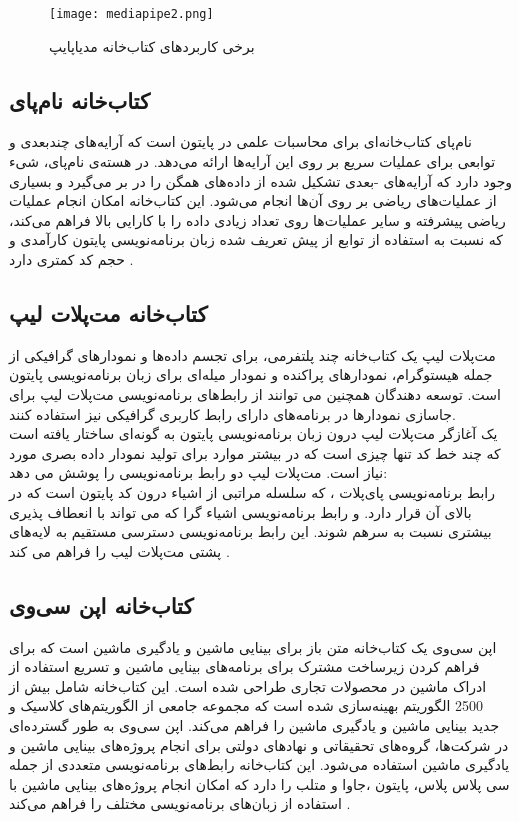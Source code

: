 \begin{figure}[h]
    \centering
    \texttt{[image: mediapipe2.png]}
    \caption[برخی کاربردهای کتاب‌خانه مدیاپایپ]{برخی کاربردهای کتاب‌خانه مدیاپایپ \cite{harris2021applying}}
\end{figure}

\subsection{کتاب‌خانه نام‌پای}
نام‌پای کتاب‌خانه‌ای برای محاسبات علمی در پایتون است که آرایه‌های چندبعدی و توابعی برای عملیات سریع  بر روی این آرایه‌ها ارائه می‌دهد. در هسته‌ی نام‌پای، شیء  وجود 
دارد که آرایه‌های -بعدی تشکیل شده از داده‌های همگن را در بر می‌گیرد و بسیاری از عملیات‌های ریاضی بر روی آن‌ها انجام می‌شود. این کتاب‌خانه امکان انجام عملیات ریاضی پیشرفته و سایر 
عملیات‌ها روی تعداد زیادی داده را با کارایی بالا فراهم می‌کند، که نسبت به استفاده از توابع از پیش تعریف شده زبان برنامه‌نویسی پایتون کارآمدی و حجم کد کمتری دارد \cite{WhatisNu62:online}.

\subsection[کتاب‌خانه مت‌پلات لیب]{کتاب‌خانه مت‌پلات لیپ }
مت‌پلات لیپ یک کتاب‌خانه چند پلتفرمی، برای تجسم داده‌ها و نمودارهای گرافیکی از جمله هیستوگرام، نمودارهای پراکنده و نمودار میله‌ای برای زبان برنامه‌نویسی
پایتون است. توسعه دهندگان همچنین می توانند از رابط‌های برنامه‌نویسی مت‌پلات لیپ برای جاسازی نمودارها در برنامه‌های دارای رابط کاربری گرافیکی نیز استفاده کنند.
\\
یک آغازگر
مت‌پلات لیپ  درون زبان برنامه‌نویسی پایتون به گونه‌ای ساختار یافته است که چند خط کد تنها چیزی است که در بیشتر موارد برای تولید نمودار داده بصری مورد نیاز است. مت‌پلات لیپ دو رابط برنامه‌نویسی را پوشش می دهد:
\\
رابط برنامه‌نویسی پای‌پلات ، که سلسله مراتبی از اشیاء درون کد پایتون است که در بالای آن  قرار دارد. و رابط برنامه‌نویسی اشیاء گرا که می تواند 
با انعطاف پذیری بیشتری نسبت به  سرهم شوند. این رابط برنامه‌نویسی دسترسی مستقیم به لایه‌های پشتی مت‌پلات لیب
را فراهم می کند \cite{Introduc75:online}.

\subsection{کتاب‌خانه اپن سی‌وی}
اپن سی‌وی یک کتاب‌خانه متن باز برای بینایی ماشین و یادگیری ماشین است که برای فراهم کردن زیرساخت مشترک برای برنامه‌های بینایی ماشین و تسریع استفاده از ادراک ماشین در محصولات
تجاری طراحی شده است. این کتاب‌خانه شامل بیش از 2500 الگوریتم بهینه‌سازی شده است که مجموعه جامعی از الگوریتم‌های کلاسیک و جدید بینایی ماشین و یادگیری ماشین 
را فراهم می‌کند. اپن سی‌وی به طور گسترده‌ای در شرکت‌ها، گروه‌های تحقیقاتی و نهادهای دولتی برای انجام پروژه‌های بینایی ماشین و یادگیری ماشین استفاده می‌شود. این کتاب‌خانه رابط‌های برنامه‌نویسی 
متعددی از جمله 
سی پلاس پلاس، پایتون ،جاوا و متلب را دارد که امکان انجام پروژه‌های بینایی ماشین با استفاده از زبان‌های برنامه‌نویسی مختلف را فراهم می‌کند \cite{AboutOpe4:online}.


